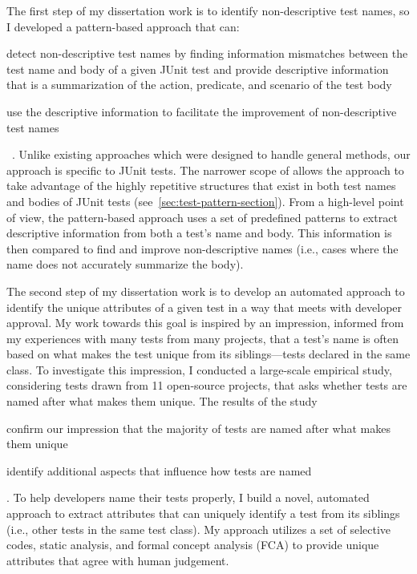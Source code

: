The first step of my dissertation work is to identify non-descriptive test names, so I developed a pattern-based approach that can:
\begin{enumerate*}
\item detect non-descriptive test names by finding information mismatches between the test name and body of a given JUnit test and provide descriptive information that is a summarization of the action, predicate, and scenario of the test body
\item use the descriptive information to facilitate the improvement of non-descriptive test names
\end{enumerate*}~\cite{wu2020pattern}.
%
Unlike existing approaches which were designed to handle general methods, our approach is specific to JUnit tests.
%
The narrower scope of allows the approach to take advantage of the highly repetitive structures that exist in both test names and bodies of JUnit tests (see~\cref{sec:test-pattern-section}).
%
From a high-level point of view, the pattern-based approach uses a set of predefined patterns to extract descriptive information from both a test's name and body.
%
This information is then compared to find and improve non-descriptive names (i.e., cases where the name does not accurately summarize the body).


The second step of my dissertation work is to develop an automated approach to identify the unique attributes of a given test in a way that meets with developer approval.
%
My work towards this goal is inspired by an impression, informed from my experiences with many tests from many projects, that a test's name is often based on what makes the test unique from its siblings---tests declared in the same class.
%
To investigate this impression, I conducted a large-scale empirical study, considering tests drawn from \num{11} open-source projects, that asks whether tests are named after what makes them unique.
%
The results of the study
\begin{enumerate*}
\item confirm our impression that the majority of tests are named after what makes them unique
\item identify additional aspects that influence how tests are named
\end{enumerate*}.
%
To help developers name their tests properly, I build a novel, automated approach to extract attributes that can uniquely identify a test from its siblings (i.e., other tests in the same test class).
% 
My approach utilizes a set of selective codes, static analysis, and formal concept analysis (FCA) to provide unique attributes that agree with human judgement.


